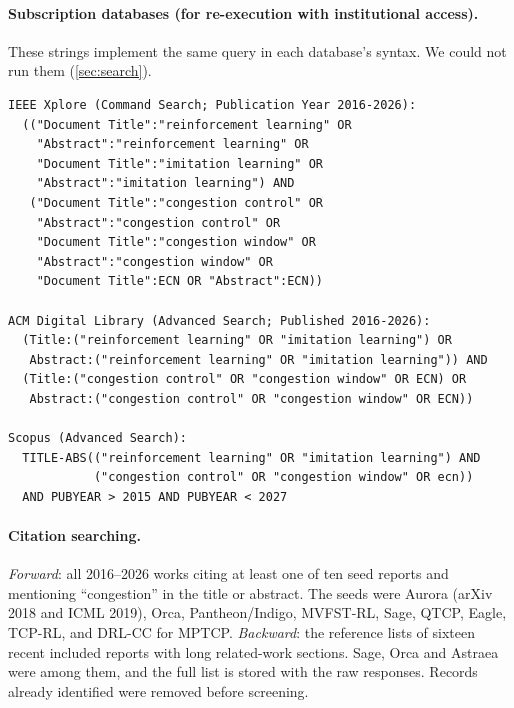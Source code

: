 \paragraph{Subscription databases (for re-execution with institutional access).} These strings implement the same query in each database's syntax. We could not run them (\cref{sec:search}).
\begin{small}
\begin{verbatim}
IEEE Xplore (Command Search; Publication Year 2016-2026):
  (("Document Title":"reinforcement learning" OR
    "Abstract":"reinforcement learning" OR
    "Document Title":"imitation learning" OR
    "Abstract":"imitation learning") AND
   ("Document Title":"congestion control" OR
    "Abstract":"congestion control" OR
    "Document Title":"congestion window" OR
    "Abstract":"congestion window" OR
    "Document Title":ECN OR "Abstract":ECN))

ACM Digital Library (Advanced Search; Published 2016-2026):
  (Title:("reinforcement learning" OR "imitation learning") OR
   Abstract:("reinforcement learning" OR "imitation learning")) AND
  (Title:("congestion control" OR "congestion window" OR ECN) OR
   Abstract:("congestion control" OR "congestion window" OR ECN))

Scopus (Advanced Search):
  TITLE-ABS(("reinforcement learning" OR "imitation learning") AND
            ("congestion control" OR "congestion window" OR ecn))
  AND PUBYEAR > 2015 AND PUBYEAR < 2027
\end{verbatim}
\end{small}

\paragraph{Citation searching.} \emph{Forward}: all 2016--2026 works citing at least one of ten seed reports and mentioning ``congestion'' in the title or abstract. The seeds were Aurora (arXiv 2018 and ICML 2019), Orca, Pantheon/Indigo, MVFST-RL, Sage, QTCP, Eagle, TCP-RL, and DRL-CC for MPTCP. \emph{Backward}: the reference lists of sixteen recent included reports with long related-work sections. Sage, Orca and Astraea were among them, and the full list is stored with the raw responses. Records already identified were removed before screening.

